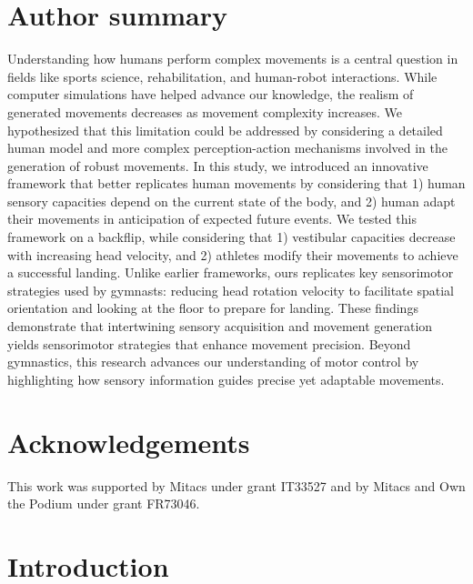 \documentclass[10pt,letterpaper]{article}
\begin{document}
\section*{Author summary}
Understanding how humans perform complex movements is a central question in fields like sports science, rehabilitation, and human-robot interactions. 
While computer simulations have helped advance our knowledge, the realism of generated movements decreases as movement complexity increases. 
We hypothesized that this limitation could be addressed by considering a detailed human model and more complex perception-action mechanisms involved in the generation of robust movements.
In this study, we introduced an innovative framework that better replicates human movements by considering that 1) human sensory capacities depend on the current state of the body, and 2) human adapt their movements in anticipation of expected future events.
We tested this framework on a backflip, while considering that 1) vestibular capacities decrease with increasing head velocity, and 2) athletes modify their movements to achieve a successful landing.
Unlike earlier frameworks, ours replicates key sensorimotor strategies used by gymnasts: reducing head rotation velocity to facilitate spatial orientation and looking at the floor to prepare for landing.
These findings demonstrate that intertwining sensory acquisition and movement generation yields sensorimotor strategies that enhance movement precision. 
Beyond gymnastics, this research advances our understanding of motor control by highlighting how sensory information guides precise yet adaptable movements.
\linenumbers


\section*{Acknowledgements}\label{sec:acknowledgements}
This work was supported by Mitacs under grant IT33527 and by Mitacs and Own the Podium under grant FR73046.


\section{Introduction}\label{sec:intro}
\end{document}
